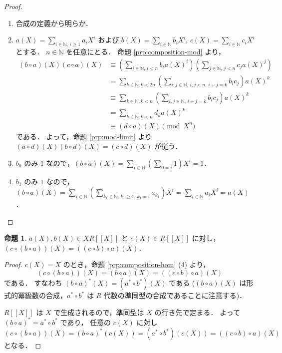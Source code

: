 \documentclass{jsarticle}
\newcommand{\N}{\mathbb{N}}
\theoremstyle{definition}
\newtheorem{Prp}{命題}
\newenvironment{prp}{\vspace{1ex}\begin{screen}\begin{Prp}}{\end{Prp}\end{screen}}
\newenvironment{prf}{\begin{leftbar}\begin{proof}}{\end{proof}\end{leftbar}}
\begin{document}
\begin{prf}
  \begin{enumerate}[(1)]
    \item 合成の定義から明らか．
    \item $a(X) = \sum_{i\in\N,\,i\ge 1} a_i X^i$ および $b(X) = \sum_{i\in\N} b_i X^i$, $c(X) = \sum_{i\in\N} c_i X^i$ とする．
        $n \in \N$ を任意にとる．
        命題 \ref{prp:composition-mod} より，
        \begin{align*}
          (b \circ a)(X) (c \circ a)(X)
          &\equiv \left( \sum_{i\in\N,\,i<n} b_i a(X)^i \right) \left( \sum_{j\in\N,\,j<n} c_j a(X)^j \right) \\
          &= \sum_{k\in\N,k<2n} \left( \sum_{i,j\in\N,\,i,j<n,\,i+j=k} b_i c_j \right) a(X)^k \\
          &\equiv \sum_{k\in\N,k<n} \left( \sum_{i,j\in\N,\,i+j=k} b_i c_j \right) a(X)^k \\
          &= \sum_{k\in\N,k<n} d_k a(X)^k \\
          &\equiv (d \circ a)(X) \pmod{X^n}
        \end{align*}
        である．
        よって，命題 \ref{prp:mod-limit} より $(a \circ d)(X) (b \circ d)(X) = (c \circ d)(X)$ が従う．
    \item $b_0$ のみ $1$ なので，$(b \circ a)(X) = \sum_{i\in\N} \left( \sum_{0=i} 1 \right) X^i = 1$．
    \item $b_1$ のみ $1$ なので，$(b \circ a)(X) = \sum_{i\in\N} \left( \sum_{k_1\in\N,\,k_1\ge 1,\,k_1=i} a_{k_1} \right) X^i = \sum_{i\in\N} a_i X^i = a(X)$．
  \end{enumerate}
\end{prf}

\begin{prp}
  $a(X), b(X) \in X R[[X]]$ と $c(X) \in R[[X]]$ に対し，
  $(c \circ (b \circ a))(X) = ((c \circ b) \circ a)(X)$．
\end{prp}
\begin{prf}
  $c(X) = X$ のとき，命題 \ref{prp:composition-hom} (4) より，
  \[
    (c \circ (b \circ a))(X) = (b \circ a)(X) = ((c \circ b) \circ a)(X)
  \]
  である．
  すなわち $(b \circ a)^*(X) = (a^* \circ b^*)(X)$ である ($(b \circ a)(X)$ は形式的冪級数の合成，$a^* \circ b^*$ は $R$ 代数の準同型の合成であることに注意する)．

  $R[[X]]$ は $X$ で生成されるので，準同型は $X$ の行き先で定まる．
  よって $(b \circ a)^* = a^* \circ b^*$ であり，
  任意の $c(X)$ に対し
  \[
    (c \circ (b \circ a))(X) = (b \circ a)^*(c(X)) = (a^* \circ b^*)(c(X)) = ((c \circ b) \circ a)(X)
  \]
  となる．
\end{prf}
\end{document}
